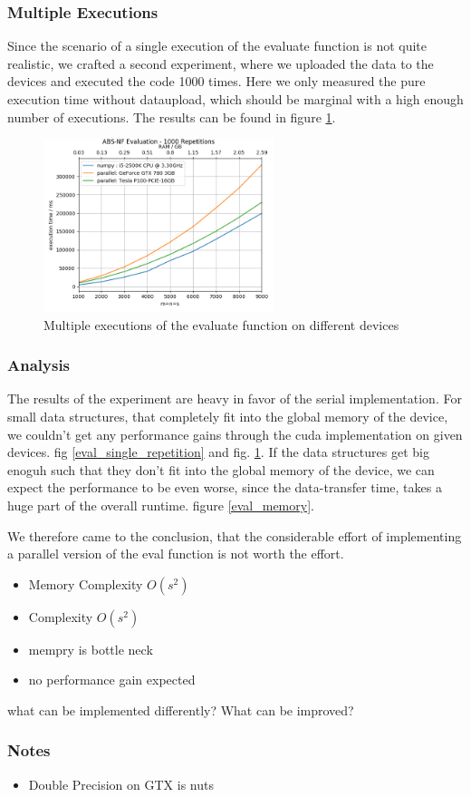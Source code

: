 \subsubsection{Multiple Executions}

Since the scenario of a single execution of the evaluate function is not quite realistic, we crafted a second experiment, where we uploaded the data to the devices and executed the code 1000 times. Here we only measured the pure execution time without dataupload, which should be marginal with a high enough number of executions. The results can be found in figure \ref{eval_1000}.

\begin{figure}[ht]
	\centering
	\includegraphics[width=0.6\textwidth]{img/eval_mult_repetition.png}
	\caption{Multiple executions of the evaluate function on different devices}
	\label{eval_1000}
\end{figure}

\subsubsection{Analysis}
The results of the experiment are heavy in favor of the serial implementation.
For small data structures, that completely fit into the global memory of the device, we couldn't get any performance gains through the cuda implementation on given devices. fig \ref{eval_single_repetition} and  fig. \ref{eval_1000}. 
If the data structures get big enoguh such that they don't fit into the global memory of the device, we can expect the performance to be even worse, since the data-transfer time, takes a huge part of the overall runtime. figure \ref{eval_memory}.

We therefore came to the conclusion, that the considerable effort of implementing a parallel version of the eval function is not worth the effort.
\begin{itemize}
	\item Memory Complexity $O(s^2)$
	\item Complexity $O(s^2)$
	\item mempry is bottle neck
	\item no performance gain expected
\end{itemize}

what can be implemented differently? What can be improved?

\subsubsection{Notes}
\begin{itemize}
	\item Double Precision on GTX is nuts
\end{itemize}

